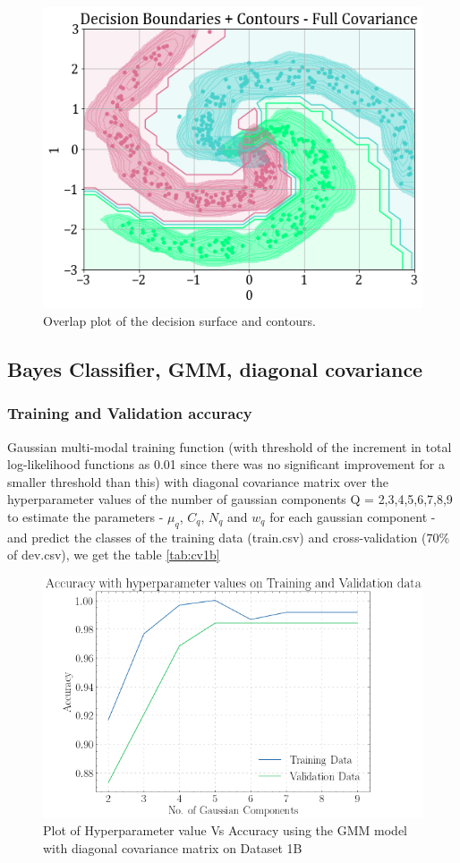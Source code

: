 \documentclass[11pt,a4paper]{article}
\begin{document}
\begin{figure}[H]
    \centering
    \includegraphics[scale=0.45]{images/1b_full_ds_contours.png}
    \caption{Overlap plot of the decision surface and contours.}
\end{figure}


\subsection{Bayes Classifier, GMM, diagonal covariance}
\subsubsection{Training and Validation accuracy}
Gaussian multi-modal training function (with threshold of the increment in total log-likelihood functions as 0.01 since there was no significant improvement for a smaller threshold than this) with diagonal covariance matrix over the hyperparameter values of the number of gaussian components Q = {2,3,4,5,6,7,8,9} to estimate the parameters - $\mu_q$, $C_q$, $N_q$ and $w_q$ for each gaussian component - and predict the classes of the training data (train.csv) and cross-validation (70\% of dev.csv), we get the table \ref{tab:cv1b}

\begin{figure}[H]
    \centering
    \includegraphics[scale=0.5]{images/acc_1b.png}
    \caption{Plot of Hyperparameter value Vs Accuracy using the GMM model with diagonal covariance matrix on Dataset 1B}
    \label{fig:acc1bGMMdiag}
\end{figure}
\end{document}

